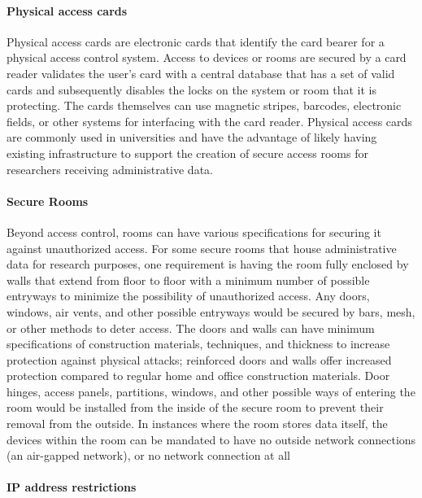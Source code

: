 \hypertarget{physical-access-cards}{%
\paragraph{Physical access cards}\label{physical-access-cards}}

Physical access cards are electronic cards that identify the card bearer
for a physical access control system. Access to devices or rooms are
secured by a card reader validates the user's card with a central
database that has a set of valid cards and subsequently disables the
locks on the system or room that it is protecting. The cards themselves
can use magnetic stripes, barcodes, electronic fields, or other systems
for interfacing with the card reader. Physical access cards are commonly
used in universities and have the advantage of likely having existing
infrastructure to support the creation of secure access rooms for
researchers receiving administrative data.

\hypertarget{secure-rooms}{%
\paragraph{Secure Rooms}\label{secure-rooms}}

Beyond access control, rooms can have various specifications for
securing it against unauthorized access. For some secure rooms that
house administrative data for research purposes, one requirement is
having the room fully enclosed by walls that extend from floor to floor
with a minimum number of possible entryways to minimize the possibility
of unauthorized access. Any doors, windows, air vents, and other
possible entryways would be secured by bars, mesh, or other methods to
deter access. The doors and walls can have minimum specifications of
construction materials, techniques, and thickness to increase protection
against physical attacks; reinforced doors and walls offer increased
protection compared to regular home and office construction materials.
Door hinges, access panels, partitions, windows, and other possible ways
of entering the room would be installed from the inside of the secure
room to prevent their removal from the outside. In instances where the
room stores data itself, the devices within the room can be mandated to
have no outside network connections (an air-gapped network), or no
network connection at all

\hypertarget{ip-address-restrictions}{%
\paragraph{IP address restrictions}\label{ip-address-restrictions}}

